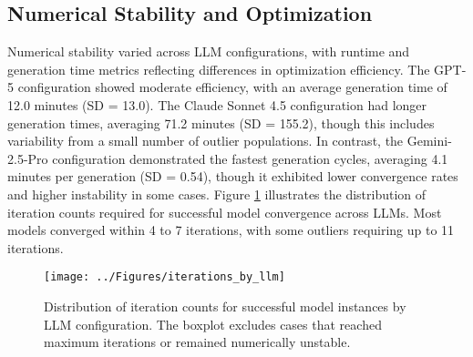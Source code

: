 \subsection{Numerical Stability and Optimization}
Numerical stability varied across LLM configurations, with runtime and generation time metrics reflecting differences in optimization efficiency. The GPT-5 configuration showed moderate efficiency, with an average generation time of 12.0 minutes (SD = 13.0). The Claude Sonnet 4.5 configuration had longer generation times, averaging 71.2 minutes (SD = 155.2), though this includes variability from a small number of outlier populations. In contrast, the Gemini-2.5-Pro configuration demonstrated the fastest generation cycles, averaging 4.1 minutes per generation (SD = 0.54), though it exhibited lower convergence rates and higher instability in some cases.
Figure \ref{fig:iterations_by_llm} illustrates the distribution of iteration counts required for successful model convergence across LLMs. Most models converged within 4 to 7 iterations, with some outliers requiring up to 11 iterations.
\begin{figure}[H]
\centering
\texttt{[image: ../Figures/iterations\_by\_llm]}
\caption{Distribution of iteration counts for successful model instances by LLM configuration. The boxplot excludes cases that reached maximum iterations or remained numerically unstable.}
\label{fig:iterations_by_llm}
\end{figure}



% 


